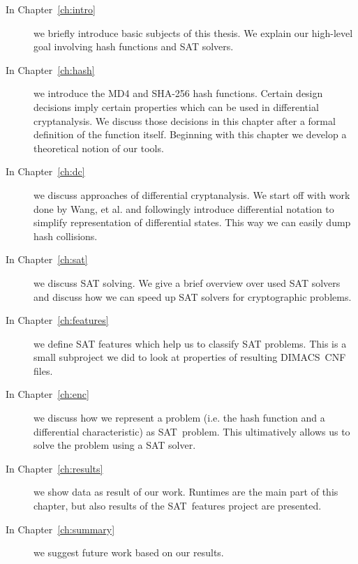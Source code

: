 \begin{description}
\item[In Chapter~\ref{ch:intro}] we briefly introduce basic subjects of this
  thesis. We explain our high-level goal involving hash functions and SAT solvers.

\item[In Chapter~\ref{ch:hash}] we introduce the MD4 and SHA-256 hash functions.
  Certain design decisions imply certain properties which can be used in differential
  cryptanalysis. We discuss those decisions in this chapter after a formal definition
  of the function itself. Beginning with this chapter we develop a theoretical notion
  of our tools.

\item[In Chapter~\ref{ch:dc}] we discuss approaches of differential cryptanalysis.
  We start off with work done by Wang, et al. and followingly introduce differential
  notation to simplify representation of differential states. This way we can easily dump
  hash collisions.

\item[In Chapter~\ref{ch:sat}] we discuss SAT solving. We give a brief overview
  over used SAT solvers and discuss how we can speed up SAT solvers for cryptographic
  problems.

\item[In Chapter~\ref{ch:features}] we define SAT features which help us to
  classify SAT problems. This is a small subproject we did to look at properties
  of resulting DIMACS~CNF files.

\item[In Chapter~\ref{ch:enc}] we discuss how we represent a problem (i.e. the hash
  function and a differential characteristic) as SAT~problem. This ultimatively
  allows us to solve the problem using a SAT solver.

\item[In Chapter~\ref{ch:results}] we show data as result of our work.
  Runtimes are the main part of this chapter, but also results of the SAT~features
  project are presented.

\item[In Chapter~\ref{ch:summary}] we suggest future work based on our results.
\end{description}
